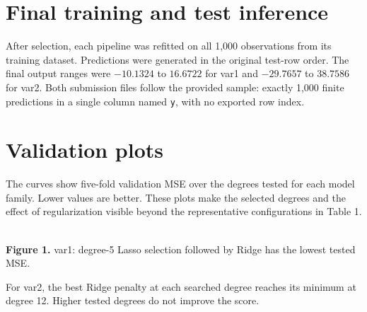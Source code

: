 \documentclass[10pt,a4paper]{article}
\begin{document}
\section{Final training and test inference}
After selection, each pipeline was refitted on all 1,000 observations from its training dataset. Predictions were generated in the original test-row order. The final output ranges were $-10.1324$ to $16.6722$ for var1 and $-29.7657$ to $38.7586$ for var2. Both submission files follow the provided sample: exactly 1,000 finite predictions in a single column named \texttt{y}, with no exported row index.

\clearpage
\section{Validation plots}
\thispagestyle{fancy}
The curves show five-fold validation MSE over the degrees tested for each model family. Lower values are better. These plots make the selected degrees and the effect of regularization visible beyond the representative configurations in Table 1.

\begin{center}
\\[2pt]
{\small\textbf{Figure 1.} var1: degree-5 Lasso selection followed by Ridge has the lowest tested MSE.}
\end{center}

For var2, the best Ridge penalty at each searched degree reaches its minimum at degree 12. Higher tested degrees do not improve the score.
\end{document}
